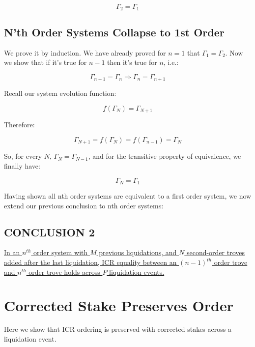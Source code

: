 \documentclass[reqno]{article}
\begin{document}
\begin{equation} 
    \Gamma_2=\Gamma_1
\end{equation}

\subsection{N’th Order Systems Collapse to 1st Order}
We prove it by induction. We have already proved for $n=1$ that $\Gamma_1=\Gamma_2$.
Now we show that if it’s true for $n-1$ then it’s true for $n$, i.e.:

\begin{equation}
    \Gamma_{n-1} = \Gamma_n \Rightarrow \Gamma_n = \Gamma_{n+1}
\end{equation}

Recall our system evolution function: 

\begin{equation} 
    f(\Gamma_N)=\Gamma_{N+1}
\end{equation}

Therefore:

\begin{equation} 
    \Gamma_{N+1} = f(\Gamma_N) = f(\Gamma_{n-1}) = \Gamma_N
\end{equation}

\bigskip
So, for every $N$, $\Gamma_N = \Gamma_{N-1}$, and for the transitive property of equivalence, we finally have:

\begin{equation}
    \Gamma_N=\Gamma_1
\end{equation}

\bigskip
Having shown all nth order systems are equivalent to a first order system, we now extend our previous conclusion to nth order systems:

\subsection{CONCLUSION 2}

\uline{In an $n^{th}$ order system with $M$ previous liquidations, and $N$ second-order troves added after the last liquidation, ICR equality between an $(n-1)^{th}$ order trove and $n^{th}$ order trove holds across $P$ liquidation events.}

\section{Corrected Stake Preserves Order}
Here we show that ICR ordering is preserved with corrected stakes across a liquidation event.\\
\end{document}
